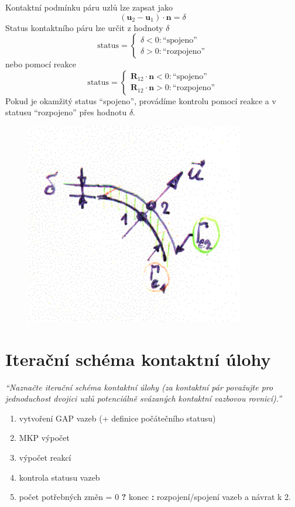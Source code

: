 \documentclass{article}
\begin{document}
	Kontaktní podmínku páru uzlů lze zapsat jako
	\begin{equation}
		(\bm{u}_2 - \bm{u}_1 ) \cdot \bm{n} = \delta
	\end{equation}
	Status kontaktního páru lze určit z hodnoty $\delta$
	\begin{equation}
		\text{status} = \left\{
		    \begin{array}{ll}
		    	\delta < 0 : \text{``spojeno''} \\
		    	\delta > 0 : \text{``rozpojeno''}
		    \end{array}
		    \right.
	\end{equation}
	nebo pomocí reakce
	\begin{equation}
		\text{status} = \left\{
		    \begin{array}{ll}
		    	\bm{R}_{12} \cdot \bm{n} < 0 : \text{``spojeno''} \\
		    	\bm{R}_{12} \cdot \bm{n} > 0 : \text{``rozpojeno''}
		    \end{array}
		    \right.
	\end{equation}
	Pokud je okamžitý status ``spojeno'', provádíme kontrolu pomocí reakce a v statusu ``rozpojeno'' přes hodnotu $\delta$.
	\begin{figure}[h!]
		\centering
		\includegraphics[width=.5\linewidth]{figs/KontaktniPar.png}
	\end{figure}

	\section{Iterační schéma kontaktní úlohy}
	\emph{``Naznačte iterační schéma kontaktní úlohy (za kontaktní pár považujte pro jednoduchost dvojici uzlů potenciálně svázaných kontaktní vazbovou rovnicí).''}

	\begin{enumerate}
		\item vytvoření GAP vazeb (+ definice počátečního statusu)
		\item MKP výpočet
		\item výpočet reakcí
		\item kontrola statusu vazeb
		\item počet potřebných změn = 0 \textbf{?} konec \textbf{:} rozpojení/spojení vazeb a návrat k 2.
	\end{enumerate}
\end{document}

